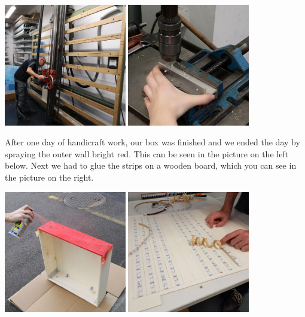 \documentclass[a4paper,12pt]{article}
\begin{document}
{ \centering
  \includegraphics[width = 0.4\textwidth]{brice.jpg}
  \space{   }
  \includegraphics[width = 0.4\textwidth]{bohren.jpg}
  \\}
 \vspace{1cm}
 
After one day of handicraft work, our box was finished and we ended the day by spraying the outer wall bright red. This can be seen in the picture on the left below.
 Next we had to glue the strips on a wooden board, which you can see in the picture on the right.
 
 \vspace{1cm}

{ \centering
  \includegraphics[width = 0.4\textwidth]{sprayen.jpg}
  \space{   }
  \includegraphics[width = 0.4\textwidth]{kleben.jpg}
  \\}
 \vspace{1cm}
 
\end{document}
